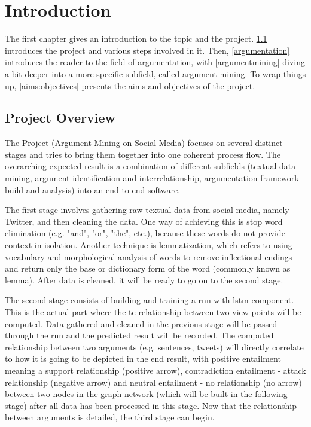\section{Introduction} \label{intro}
    The first chapter gives an introduction to the topic and the project. \cref{projoverview} introduces the project and various steps involved in it. Then, \cref{argumentation} introduces the reader to the field of argumentation, with \cref{argumentmining} diving a bit deeper into a more specific subfield, called argument mining. To wrap things up, \cref{aims:objectives} presents the aims and objectives of the project.

    \subsection{Project Overview} \label{projoverview}
        The Project (Argument Mining on Social Media) focuses on several distinct stages and tries to bring them together into one coherent process flow. The overarching expected result is a combination of different subfields (textual data mining, argument identification and interrelationship, argumentation framework build and analysis) into an end to end software. 
     
        The first stage involves gathering raw textual data from social media, namely Twitter, and then cleaning the data. One way of achieving this is stop word elimination (e.g. "and", "or", "the", etc.), because these words do not provide context in isolation. Another technique is lemmatization, which refers to using vocabulary and morphological analysis of words to remove inflectional endings and return only the base or dictionary form of the word (commonly known as lemma). After data is cleaned, it will be ready to go on to the second stage.
     
        The second stage consists of building and training a \gls{rnn} with \gls{lstm} component. This is the actual part where the \gls{te} relationship between two view points will be computed. Data gathered and cleaned in the previous stage will be passed through the \gls{rnn} and the predicted result will be recorded. The computed relationship between two arguments (e.g. sentences, tweets) will directly correlate to how it is going to be depicted in the end result, with positive entailment meaning a support relationship (positive arrow), contradiction entailment - attack relationship (negative arrow) and neutral entailment - no relationship (no arrow) between two nodes in the graph network (which will be built in the following stage) after all data has been processed in this stage. Now that the relationship between arguments is detailed, the third stage can begin.
     
